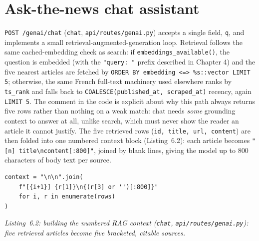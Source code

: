 \section{Ask-the-news chat assistant}
\label{sec:chat-assistant}
\begin{sloppypar}
\texttt{POST /genai/chat} (\texttt{chat}, \texttt{api/\allowbreak routes/\allowbreak genai.py}) accepts a single field, \texttt{q}, and implements a small retrieval-augmented-generation loop. Retrieval follows the same cached-embedding check as search: if \texttt{embeddings\_available()}, the question is embedded (with the \texttt{"query: "} prefix described in Chapter 4) and the five nearest articles are fetched by \texttt{ORDER BY embedding <=> \%s::vector LIMIT 5}; otherwise, the same French full-text machinery used elsewhere ranks by \texttt{ts\_rank} and falls back to \texttt{COALESCE(published\_at, scraped\_at)} recency, again \texttt{LIMIT 5}. The comment in the code is explicit about why this path always returns five rows rather than nothing on a weak match: chat needs \emph{some} grounding context to answer at all, unlike search, which must never show the reader an article it cannot justify. The five retrieved rows (\texttt{id, title, url, content}) are then folded into one numbered context block (Listing~6.2): each article becomes \texttt{"[n] title\textbackslash ncontent[:800]"}, joined by blank lines, giving the model up to 800 characters of body text per source.
\end{sloppypar}

\begin{verbatim}
context = "\n\n".join(
    f"[{i+1}] {r[1]}\n{(r[3] or '')[:800]}"
    for i, r in enumerate(rows)
)
\end{verbatim}
\begin{center}
\textit{Listing~6.2: building the numbered RAG context (\texttt{chat}, \texttt{api/routes/genai.py}): five retrieved articles become five bracketed, citable sources.}
\end{center}

